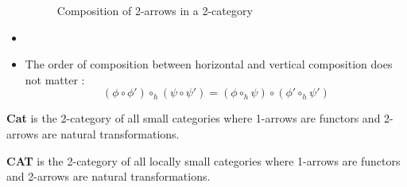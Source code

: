 \begin{defn}[2-category]
\begin{itemize}
\begin{figure}[h]
                  \caption{Composition of 2-arrows in a 2-category}
                  \label{fig:2-comp}
              \end{figure}
        \item
        \item The order of composition between horizontal and vertical composition does not matter : 
            $$(\phi\circ\phi')\circ_h(\psi\circ\psi') = (\phi\circ_h\psi)\circ(\phi'\circ_h\psi')$$
    \end{itemize}
\end{defn}




\begin{defn}[\bf Cat]
    \textbf{Cat}\label{nomencl:Cat} is the 2-category of all small categories where 1-arrows are functors and 2-arrows are natural transformations.
\end{defn}
\begin{defn}[\bf CAT]
    \textbf{CAT}\label{nomencl:CAT} is the 2-category of all locally small categories where 1-arrows are functors and 2-arrows are natural transformations.
\end{defn}

